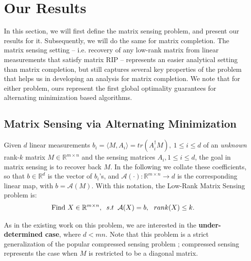\documentclass[11pt]{article}
\theoremstyle{plain}
\theoremstyle{definition}
\newcommand{\rmn}{\mathbb{R}^{m \times n}}
\newcommand{\aff}{{\mathcal A}}
\begin{document}
\section{Our Results}\label{sec:results}
In this section, we will  first define the matrix sensing problem, and present our results for it. Subsequently, we will do the same for matrix completion. The matrix sensing setting -- i.e. recovery of any low-rank matrix from linear measurements that satisfy matrix RIP -- represents an easier analytical setting than matrix completion, but still captures several  key properties of the problem that helps us in developing an analysis for matrix completion.%
We note that for either problem, ours represent the first global optimality guarantees for alternating minimization based algorithms. 
\subsection*{Matrix Sensing via Alternating Minimization}
Given $d$ linear measurements $b_i = \langle M,A_i\rangle = tr(A_i^\dag M),\ 1\leq i\leq d$ of an {\em unknown} rank-$k$ matrix $M\in \mathbb{R}^{m\times n}$ and the sensing matrices $A_i, 1\leq i\leq d$, the goal in matrix sensing is to recover back $M$. 
In the following we  collate these coefficients, so that $b\in \mathbb{R}^{d}$ is the vector of $b_i$'s, and $\aff(\cdot):\mathbb{R}^{m\times n}\rightarrow d$ is the corresponding linear map, with $b=\aff(M)$. With this notation, the Low-Rank Matrix Sensing problem is:
\renewcommand{\theequation}{LRMS}
\begin{equation}\label{eq:lrms}
 \hspace*{-10pt}\text{Find }X\in \rmn, \;\; s.t \;\; {\mathcal A}(X) = b,\ \  rank(X)\leq k.
\end{equation}
\renewcommand{\theequation}{\arabic{equation}}
\addtocounter{equation}{-1}
As in the existing work \cite{RechtFP2007} on this problem, we are interested in the  {\bf under-determined case}, where $d < mn$. Note that this problem is a strict generalization of the popular compressed sensing problem \cite{CandesT2005}; compressed sensing represents the case when $M$ is restricted to be a diagonal matrix.%
\end{document}
